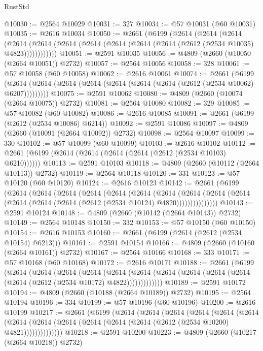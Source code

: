 \begin{lexlean}{RustStd}
\begin{coremodule}
@10030 := @2564 @10029
@10031 := 327
@10034 := @57 @10031 (@60 @10031)
@10035 := @2616 @10034
@10050 := @2661
    (@6199
      (@2614
        (@2614
          (@2614
            (@2614 (@2614 (@2614 (@2614 (@2614 (@2614 (@2614 (@2612 (@2534 @10035) @4823))))))))))))
@10051 := @2591 @10035
@10056 := @4809 (@2660 (@10050 (@2664 @10051)) @2732)
@10057 := @2564 @10056
@10058 := 328
@10061 := @57 @10058 (@60 @10058)
@10062 := @2616 @10061
@10074 := @2661
    (@6199 (@2614 (@2614 (@2614 (@2614 (@2614 (@2614 (@2614 (@2612 (@2534 @10062) @6207)))))))))
@10075 := @2591 @10062
@10080 := @4809 (@2660 (@10074 (@2664 @10075)) @2732)
@10081 := @2564 @10080
@10082 := 329
@10085 := @57 @10082 (@60 @10082)
@10086 := @2616 @10085
@10091 := @2661 (@6199 (@2612 (@2534 @10086) @6214))
@10092 := @2591 @10086
@10097 := @4809 (@2660 (@10091 (@2664 @10092)) @2732)
@10098 := @2564 @10097
@10099 := 330
@10102 := @57 @10099 (@60 @10099)
@10103 := @2616 @10102
@10112 := @2661 (@6199 (@2614 (@2614 (@2614 (@2614 (@2612 (@2534 @10103) @6210))))))
@10113 := @2591 @10103
@10118 := @4809 (@2660 (@10112 (@2664 @10113)) @2732)
@10119 := @2564 @10118
@10120 := 331
@10123 := @57 @10120 (@60 @10120)
@10124 := @2616 @10123
@10142 := @2661
    (@6199
      (@2614
        (@2614
          (@2614
            (@2614
              (@2614
                (@2614
                  (@2614
                    (@2614
                      (@2614 (@2614 (@2614 (@2614 (@2614 (@2612 (@2534 @10124) @4820)))))))))))))))
@10143 := @2591 @10124
@10148 := @4809 (@2660 (@10142 (@2664 @10143)) @2732)
@10149 := @2564 @10148
@10150 := 332
@10153 := @57 @10150 (@60 @10150)
@10154 := @2616 @10153
@10160 := @2661 (@6199 (@2614 (@2612 (@2534 @10154) @6213)))
@10161 := @2591 @10154
@10166 := @4809 (@2660 (@10160 (@2664 @10161)) @2732)
@10167 := @2564 @10166
@10168 := 333
@10171 := @57 @10168 (@60 @10168)
@10172 := @2616 @10171
@10188 := @2661
    (@6199
      (@2614
        (@2614
          (@2614
            (@2614
              (@2614
                (@2614 (@2614 (@2614 (@2614 (@2614 (@2614 (@2612 (@2534 @10172) @4822)))))))))))))
@10189 := @2591 @10172
@10194 := @4809 (@2660 (@10188 (@2664 @10189)) @2732)
@10195 := @2564 @10194
@10196 := 334
@10199 := @57 @10196 (@60 @10196)
@10200 := @2616 @10199
@10217 := @2661
    (@6199
      (@2614
        (@2614
          (@2614
            (@2614
              (@2614
                (@2614
                  (@2614
                    (@2614 (@2614 (@2614 (@2614 (@2614 (@2612 (@2534 @10200) @4821))))))))))))))
@10218 := @2591 @10200
@10223 := @4809 (@2660 (@10217 (@2664 @10218)) @2732)

\end{coremodule}
\end{lexlean}
